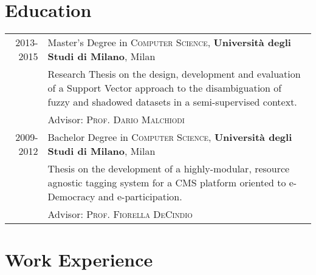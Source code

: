 \documentclass[a4paper,10pt]{article} %
\begin{document}
\section{Education}

\begin{tabular}{rp{11cm}}	
\textsc{2013-2015} & Master's Degree in \textsc{Computer Science}, \textbf{Università degli Studi di Milano}, Milan\\
& \footnotesize{Research Thesis on the design, development and evaluation of a Support Vector approach to the  disambiguation of fuzzy and shadowed datasets in a semi-supervised context.} \\ &\small Advisor: \textsc{Prof. Dario Malchiodi} \\

	
\textsc{2009-2012} & Bachelor Degree in \textsc{Computer Science}, \textbf{Università degli Studi di Milano}, Milan\\
& \footnotesize{Thesis on the development of a highly-modular, resource agnostic tagging system for a CMS platform oriented to e-Democracy and e-participation.} \\ &\small Advisor: \textsc{Prof. Fiorella DeCindio}
\end{tabular}



\section{Work Experience}
\end{document}
